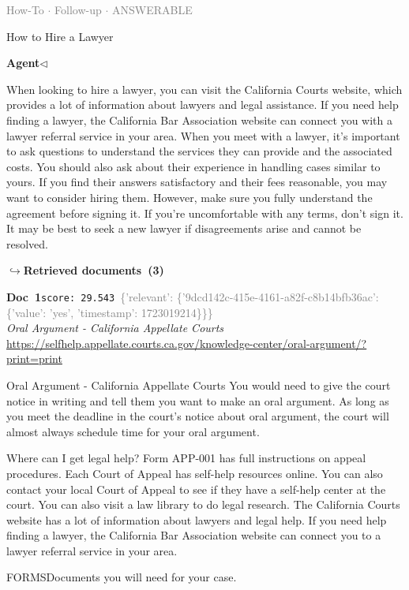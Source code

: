 \documentclass[a4paper,11pt]{article}
\begin{document}
\vspace{0.5em}
\hfill{\tiny\textcolor{gray}{How-To $\cdot$ Follow-up $\cdot$ ANSWERABLE}}
\begin{userbubble}
How to Hire a Lawyer
\end{userbubble}
\noindent\hfill{\small\textcolor{agentcolor}{\textbf{Agent\enspace$\triangleleft$}}}
\begin{agentbubble}
When looking to hire a lawyer, you can visit the California Courts website, which provides a lot of information about lawyers and legal assistance. If you need help finding a lawyer, the California Bar Association website can connect you with a lawyer referral service in your area. When you meet with a lawyer, it's important to ask questions to understand the services they can provide and the associated costs. You should also ask about their experience in handling cases similar to yours. If you find their answers satisfactory and their fees reasonable, you may want to consider hiring them. However, make sure you fully understand the agreement before signing it. If you're uncomfortable with any terms, don't sign it. It may be best to seek a new lawyer if disagreements arise and cannot be resolved.
\end{agentbubble}
\noindent\hfill{\footnotesize\textcolor{doccolor}{\textbf{$\hookrightarrow$\enspace Retrieved documents~(3)}}}
\begin{docenv}
{\footnotesize\textcolor{doccolor}{\textbf{Doc~1}}}\hfill{\tiny\texttt{score:~29.543}}\ {\tiny\textcolor{gray}{\{'relevant': \{'9dcd142c-415e-4161-a82f-c8b14bfb36ac': \{'value': 'yes', 'timestamp': 1723019214\}\}\}}}\\[3pt]
{\small\textit{Oral Argument - California Appellate Courts}}\\[2pt]
{\tiny\url{https://selfhelp.appellate.courts.ca.gov/knowledge-center/oral-argument/?print=print}}\\[4pt]
{\footnotesize Oral Argument - California Appellate Courts
You would need to give the court notice in writing and tell them you want to make an oral argument. As long as you meet the deadline in the court’s notice about oral argument, the court will almost always schedule time for your oral argument.
 
 Where can I get legal help? Form APP-001 has full instructions on appeal procedures.
Each Court of Appeal has self-help resources online. You can also contact your local Court of Appeal to see if they have a self-help center at the court.
You can also visit a law library to do legal research.
The California Courts website has a lot of information about lawyers and legal help.
If you need help finding a lawyer, the California Bar Association website can connect you to a lawyer referral service in your area.
 
FORMSDocuments you will need for your case.}
\end{docenv}
\end{document}
